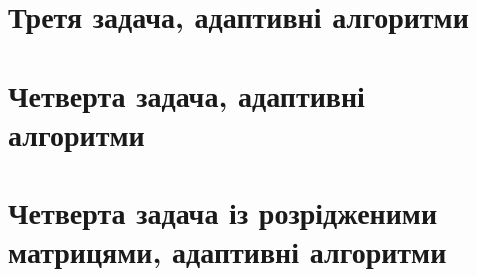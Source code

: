 

\section{Третя задача, адаптивні алгоритми}



\section{Четверта задача, адаптивні алгоритми}



\section{Четверта задача із розрідженими матрицями, адаптивні алгоритми}


